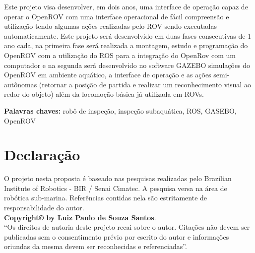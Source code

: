 Este projeto visa desenvolver, em dois anos, uma interface de operação capaz de operar o OpenROV  com uma interface operacional de fácil compreensão e utilização tendo algumas ações realizadas pelo ROV sendo executadas automaticamente. Este projeto será desenvolvido em duas fases consecutivas de 1 ano cada, na primeira fase será realizada a montagem, estudo e programação do OpenROV com a utilização do ROS para a integração do OpenRov com um computador e na segunda será desenvolvido no software GAZEBO simulações do OpenROV em ambiente aquático, a interface de operação e as ações semi-autônomas (retornar a posição de partida e realizar um reconhecimento visual ao redor do objeto) além da locomoção básica já utilizada em ROVs.


\vspace*{1cm}
\noindent \textbf{Palavras chaves: }robô de inspeção, inspeção subaquática, ROS, GASEBO, OpenROV

\chapter*{Declaração}
O projeto nesta proposta é baseado nas pesquisas realizadas pelo Brazilian Institute of Robotics - BIR / Senai Cimatec. A pesquisa versa na área de robótica sub-marina. Referências contidas nela são estritamente de responsabilidade do autor.\\
\vspace*{8cm}
\vfill
\noindent \textbf{Copyright\copyright{} by Luiz Paulo de Souza Santos}.\\
``Os direitos de autoria deste projeto recai sobre o autor. Citações não devem ser publicadas sem o consentimento prévio por escrito do autor e informações oriundas da mesma devem ser reconhecidas e referenciadas''.



